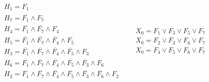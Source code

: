 \documentclass{article}
\begin{document}
\begin{normalsize}
	\begin{Large}
		\begin{align}
			\begin{gathered}
				H_1 = F_1\nonumber\\		
				H_7 = \overline{F_1}\land F_7\nonumber\\
				H_4 = \overline{F_1}\land \overline{F_7}\land F_4\nonumber\\
				H_5 = \overline{F_1}\land \overline{F_7}\land \overline{F_4}\land F_5\nonumber\\
				H_3 = \overline{F_1}\land \overline{F_7}\land \overline{F_4}\land \overline{F_5}\land F_3\nonumber\\
				H_6 = \overline{F_1}\land \overline{F_7}\land \overline{F_4}\land \overline{F_5}\land \overline{F_3}\land F_6\nonumber\\
				H_2 = \overline{F_1}\land \overline{F_7}\land \overline{F_4}\land \overline{F_5}\land \overline{F_3}\land \overline{F_6}\land F_2\nonumber
			\end{gathered}
			&&
			\begin{gathered}
				X_0=F_1\lor F_3\lor F_5\lor F_7\nonumber\\
				X_0=F_2\lor F_3\lor F_6\lor F_7\nonumber\\
				X_0=F_4\lor F_5\lor F_6\lor F_7\nonumber
			\end{gathered}
		\end{align}
	\end{Large}


\end{normalsize}
\end{document}
